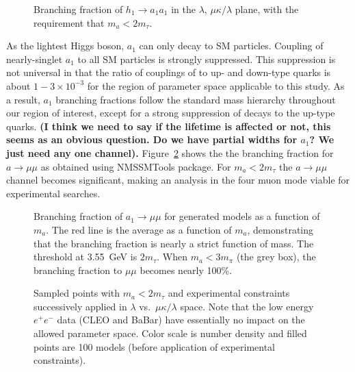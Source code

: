 \documentclass[aps,prl,nofootinbib,superscriptaddress]{revtex4}
\begin{document}
\begin{figure}[htb]
\caption{Branching fraction of $h_1 \to a_1a_1$ in 
  the $\lambda$, $\mu\kappa/\lambda$ plane, with the requirement that $m_a <
  2m_\tau$. \label{fig:brhaa}}
\end{figure}

As the lightest Higgs boson, $a_1$ can only decay to SM particles. Coupling of nearly-singlet 
$a_1$ to all SM particles is strongly suppressed. This suppression is not universal in that 
the ratio of couplings of to up- and down-type quarks is about $1-3 \times 10^{-3}$ for the 
region of parameter space applicable to this study. As a result, $a_1$ branching fractions 
follow the standard mass hierarchy throughout our region of interest, except for a strong 
suppression of decays to the up-type quarks. {\bf (I think we need to say if the lifetime 
is affected or not, this seems as an obvious question. Do we have partial widths for $a_1$? We 
just need any one channel).} Figure~\ref{fig:bramm} shows the the branching fraction for 
$a \to \mu\mu$ as obtained using NMSSMTools package. For $m_a < 2m_\tau$ the $a \to \mu\mu$ 
channel becomes significant, making an analysis in the four muon mode viable for experimental 
searches. 

\begin{figure}[htb]
\caption{ Branching fraction of $a_1 \to \mu \mu$ for generated
  models as a function of $m_a$.  The red line is the average as a
  function of $m_a$, demonstrating that the branching fraction is
  nearly a strict function of mass.  The threshold at 3.55~GeV is
  $2m_\tau$.  When $m_a < 3m_\pi$ (the grey box), the branching
  fraction to $\mu\mu$ becomes nearly 100\%. \label{fig:bramm}}
\end{figure}

\begin{figure*}[t]
\caption{Sampled points with $m_a < 2m_\tau$ and experimental constraints successively applied 
in $\lambda$ vs.\ $\mu\kappa/\lambda$ space. Note that the low energy $e^+e^-$ data (CLEO and
BaBar) have essentially no impact on the allowed parameter space. Color scale is number density 
and filled points are 100 models (before application of experimental 
constraints). \label{fig:exclusion_params}}
\end{figure*}
\end{document}
